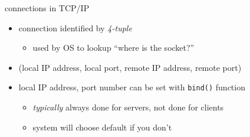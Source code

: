 \begin{frame}{connections in TCP/IP}
    \begin{itemize}
    \item connection identified by \textit{4-tuple}
        \begin{itemize}
        \item used by OS to lookup ``where is the socket?''
        \end{itemize}
    \item \small(local IP address, local port, remote IP address, remote port)
    \vspace{.5cm}
    \item local IP address, port number can be set with \texttt{bind()} function
        \begin{itemize}
        \item \textit{typically} always done for servers, not done for clients
        \item system will choose default if you don't
        \end{itemize}
    \end{itemize}
\end{frame}